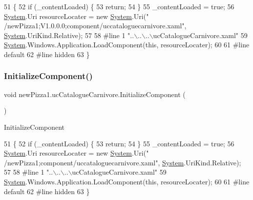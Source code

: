 \begin{DoxyCode}
51                                           \{
52             \textcolor{keywordflow}{if} (\_contentLoaded) \{
53                 \textcolor{keywordflow}{return};
54             \}
55             \_contentLoaded = \textcolor{keyword}{true};
56             \hyperlink{namespaceSystem}{System}.Uri resourceLocater = \textcolor{keyword}{new} \hyperlink{namespaceSystem}{System}.Uri(\textcolor{stringliteral}{"
      /newPizza1;V1.0.0.0;component/uccataloguecarnivore.xaml"}, \hyperlink{namespaceSystem}{System}.UriKind.Relative);
57             
58 \textcolor{preprocessor}{            #line 1 "..\(\backslash\)..\(\backslash\)..\(\backslash\)ucCatalogueCarnivore.xaml"}
59             \hyperlink{namespaceSystem}{System}.Windows.Application.LoadComponent(\textcolor{keyword}{this}, resourceLocater);
60             
61 \textcolor{preprocessor}{            #line default}
62 \textcolor{preprocessor}{            #line hidden}
63         \}
\end{DoxyCode}
\mbox{\label{classnewPizza1_1_1ucCatalogueCarnivore_ae3fbe460c9b1305f8cd5d685e12746ae}} 
\subsubsection{\texorpdfstring{Initialize\+Component()}{InitializeComponent()}\hspace{0.1cm}{\footnotesize\ttfamily [6/6]}}
{\footnotesize\ttfamily void new\+Pizza1.\+uc\+Catalogue\+Carnivore.\+Initialize\+Component (\begin{DoxyParamCaption}{ }\end{DoxyParamCaption})\hspace{0.3cm}{\ttfamily [inline]}}



Initialize\+Component 


\begin{DoxyCode}
51                                           \{
52             \textcolor{keywordflow}{if} (\_contentLoaded) \{
53                 \textcolor{keywordflow}{return};
54             \}
55             \_contentLoaded = \textcolor{keyword}{true};
56             \hyperlink{namespaceSystem}{System}.Uri resourceLocater = \textcolor{keyword}{new} \hyperlink{namespaceSystem}{System}.Uri(\textcolor{stringliteral}{"
      /newPizza1;component/uccataloguecarnivore.xaml"}, \hyperlink{namespaceSystem}{System}.UriKind.Relative);
57             
58 \textcolor{preprocessor}{            #line 1 "..\(\backslash\)..\(\backslash\)..\(\backslash\)ucCatalogueCarnivore.xaml"}
59             \hyperlink{namespaceSystem}{System}.Windows.Application.LoadComponent(\textcolor{keyword}{this}, resourceLocater);
60             
61 \textcolor{preprocessor}{            #line default}
62 \textcolor{preprocessor}{            #line hidden}
63         \}
\end{DoxyCode}


